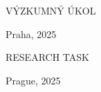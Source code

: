 \thispagestyle{empty}

\begin{center}

{\large \bf \cvut} 
    
{\large \bf \fjfi}
    
\vspace{15mm}

{\large \bf \kf} 
    
{\large \bf \obor}
    
\vspace{10mm} 

\epsfysize=30mm 

\vspace{15mm}
  
{\Large VÝZKUMNÝ ÚKOL}

\vspace{15mm}
   
   
{\Huge \bf \nazevcz} 
 

\vspace{6mm}

   
   \vfill
   {\large
    
    Praha, 2025 \hfill \autor}
\end{center}

\newpage

\thispagestyle{empty}

\begin{center}

{\large \bf \cvuten} 
    
{\large \bf \fjfien}
    
\vspace{15mm}

{\large \bf \kfen} 
    
{\large \bf \oboren}
    
\vspace{10mm} 

\epsfysize=30mm 

\vspace{15mm}
  
{\Large RESEARCH TASK}

\vspace{15mm}
 
{\Huge \bf \nazeven}

\vspace{6mm}

   
   \vfill
   {\large
    
    Prague, 2025 \hfill \autor}
\end{center}

